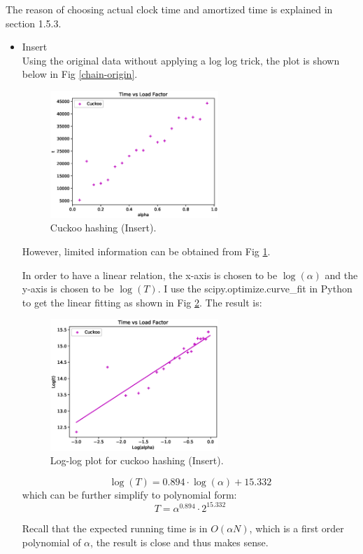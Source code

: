 \documentclass{article}
\begin{document}
\begin{spacing}{1.2}
The reason of choosing actual clock time and amortized time is explained in section 1.5.3.
\begin{itemize}
    \item Insert\\
    Using the original data without applying a log log trick, the plot is shown below in Fig \ref{chain-origin}.
    \begin{figure}[!htb]
        \centering
        \includegraphics[width=0.6\textwidth]{../output/fig/insert_original_cuckoo.eps}
        \caption{Cuckoo hashing (Insert).}
        \label{cuckoo-origin}
    \end{figure}

    However, limited information can be obtained from Fig \ref{cuckoo-origin}.

    In order to have a linear relation, the x-axis is chosen to be $\log(\alpha)$ and the y-axis is chosen to be $\log(T)$. I use the scipy.optimize.curve\_fit in Python to get the linear fitting as shown in Fig \ref{cuckoo-insert}. The result is:
    \begin{figure}[!htb]
        \centering
        \includegraphics[width=0.6\textwidth]{../output/fig/insert_cuckoo.eps}
        \caption{Log-log plot for cuckoo hashing (Insert).}
        \label{cuckoo-insert}
    \end{figure}
    
    \begin{equation*}
        \log(T) = 0.894 \cdot \log(\alpha) + 15.332
    \end{equation*}
    which can be further simplify to polynomial form:
    \begin{equation*}
        T = \alpha^{0.894}\cdot 2^{15.332}
    \end{equation*}
    
    Recall that the expected running time is in $O(\alpha N)$, which is a first order polynomial of $\alpha$, the result is close and thus makes sense.
\end{itemize}

\end{spacing}
\end{document}

